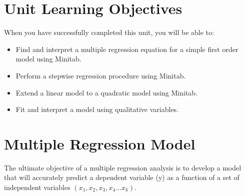 \documentclass[]{report}
\begin{document}
\newpage
\section*{Unit Learning Objectives}
When you have successfully completed this unit, you will be able to:
\begin{itemize}
	\item  Find and interpret a multiple regression equation for a simple first order model
using Minitab.
	\item  Perform a stepwise regression procedure using Minitab.
	\item  Extend a linear model to a quadratic model using Minitab.
	\item  Fit and interpret a model using qualitative variables.
\end{itemize}


\section*{Multiple Regression Model}
The ultimate objective of a multiple regression analysis is to develop a
model that will accurately predict a dependent variable (y) as a function
of a set of independent variables $(x_1, x_2, x_3, x_4 \ldots x_k)$.
\end{document}
